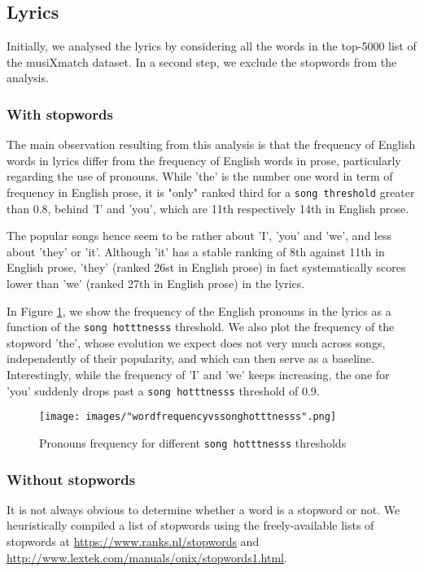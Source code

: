 \documentclass[11pt]{article}
\renewcommand\_{\textunderscore\allowbreak}
\begin{document}
 	
\subsection{Lyrics}
Initially, we analysed the lyrics by considering all the words in the top-5000 list of the musiXmatch dataset. In a second step, we exclude the stopwords from the analysis.

\subsubsection{With stopwords}
The main observation resulting from this analysis is that the frequency of English words in lyrics differ from the frequency of English words in prose, particularly regarding the use of pronouns.
While 'the' is the number one word in term of frequency in English prose, it is "only" ranked third for a \texttt{song threshold} greater than 0.8, behind 'I' and 'you', which are 11th respectively 14th in English prose.

The popular songs hence seem to be rather about 'I', 'you' and 'we', and less about 'they' or 'it'.
Although 'it' has a stable ranking of 8th against 11th in English prose, 'they' (ranked 26st in English prose) in fact systematically scores lower than 'we' (ranked 27th in English prose) in the lyrics.

In Figure \ref{fig:word_frequency_stopwords}, we show the frequency of the English pronouns in the lyrics as a function of the \texttt{song hotttnesss} threshold.
We also plot the frequency of the stopword 'the', whose evolution we expect does not very much across songs, independently of their popularity, and which can then serve as a baseline.
Interestingly, while the frequency of 'I' and 'we' keeps increasing, the one for 'you' suddenly drops past a \texttt{song hotttnesss} threshold of 0.9.


\begin{figure}[h!]
\centering
\captionsetup{width=1.0\textwidth}
\texttt{[image: images/"word\_frequency\_vs\_song\_hotttnesss".png]}
\caption{Pronouns frequency for different \texttt{song hotttnesss} thresholds}
\label{fig:word_frequency_stopwords}
\end{figure}

\subsubsection{Without stopwords}
It is not always obvious to determine whether a word is a stopword or not. We heuristically compiled a list of stopwords using the freely-available lists of stopwords at \url{https://www.ranks.nl/stopwords} and \url{http://www.lextek.com/manuals/onix/stopwords1.html}.
\end{document}
